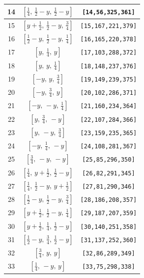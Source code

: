 \documentclass[fleqn,8pt]{jsarticle}
\begin{document}
\begin{longtable}{ccc}
14 & $\left[ \frac{1}{4},\, \frac{1}{2} - y,\, \frac{1}{2} - y \right]$ & {\tt [14,56,325,361]} \\ \hline
15 & $\left[ y + \frac{1}{2},\, \frac{1}{2} - y,\, \frac{3}{4} \right]$ & {\tt [15,167,221,379]} \\ \hline
16 & $\left[ \frac{1}{2} - y,\, \frac{1}{2} - y,\, \frac{1}{4} \right]$ & {\tt [16,165,220,378]} \\ \hline
17 & $\left[ y,\, \frac{1}{4},\, y \right]$ & {\tt [17,103,288,372]} \\ \hline
18 & $\left[ y,\, y,\, \frac{1}{4} \right]$ & {\tt [18,148,237,376]} \\ \hline
19 & $\left[ - y,\, y,\, \frac{3}{4} \right]$ & {\tt [19,149,239,375]} \\ \hline
20 & $\left[ - y,\, \frac{3}{4},\, y \right]$ & {\tt [20,102,286,371]} \\ \hline
21 & $\left[ - y,\, - y,\, \frac{1}{4} \right]$ & {\tt [21,160,234,364]} \\ \hline
22 & $\left[ y,\, \frac{3}{4},\, - y \right]$ & {\tt [22,107,284,366]} \\ \hline
23 & $\left[ y,\, - y,\, \frac{3}{4} \right]$ & {\tt [23,159,235,365]} \\ \hline
24 & $\left[ - y,\, \frac{1}{4},\, - y \right]$ & {\tt [24,108,281,367]} \\ \hline
25 & $\left[ \frac{3}{4},\, - y,\, - y \right]$ & {\tt [25,85,296,350]} \\ \hline
26 & $\left[ \frac{1}{4},\, y + \frac{1}{2},\, \frac{1}{2} - y \right]$ & {\tt [26,82,291,345]} \\ \hline
27 & $\left[ \frac{1}{4},\, \frac{1}{2} - y,\, y + \frac{1}{2} \right]$ & {\tt [27,81,290,346]} \\ \hline
28 & $\left[ \frac{1}{2} - y,\, \frac{1}{2} - y,\, \frac{3}{4} \right]$ & {\tt [28,186,208,357]} \\ \hline
29 & $\left[ y + \frac{1}{2},\, \frac{1}{2} - y,\, \frac{1}{4} \right]$ & {\tt [29,187,207,359]} \\ \hline
30 & $\left[ y + \frac{1}{2},\, \frac{1}{4},\, \frac{1}{2} - y \right]$ & {\tt [30,140,251,358]} \\ \hline
31 & $\left[ \frac{1}{2} - y,\, \frac{3}{4},\, \frac{1}{2} - y \right]$ & {\tt [31,137,252,360]} \\ \hline
32 & $\left[ \frac{3}{4},\, y,\, y \right]$ & {\tt [32,86,289,349]} \\ \hline
33 & $\left[ \frac{1}{4},\, - y,\, y \right]$ & {\tt [33,75,298,338]} \\ \hline

\end{longtable}
\end{document}

